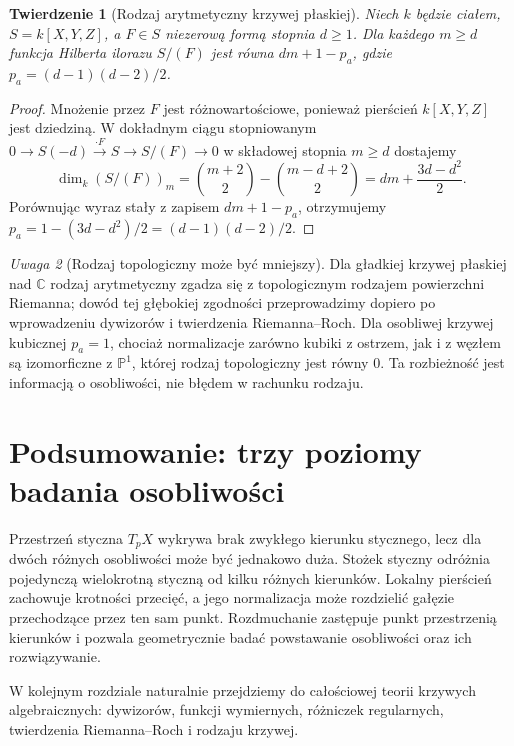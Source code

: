 \documentclass[11pt,a4paper,openany]{report}
\numberwithin{equation}{section}
\theoremstyle{plain}
\newtheorem{twierdzenie}{Twierdzenie}[section]
\theoremstyle{definition}
\theoremstyle{remark}
\newtheorem{uwaga}[twierdzenie]{Uwaga}
\newcommand{\C}{\mathbb C}
\newcommand{\PP}{\mathbb P}
\begin{document}
\begin{twierdzenie}[Rodzaj arytmetyczny krzywej płaskiej]
\label{tw:arithmetic-genus-plane}
Niech $k$ będzie ciałem, $S=k[X,Y,Z]$, a $F\in S$
niezerową formą stopnia $d\ge1$. Dla każdego $m\ge d$
funkcja Hilberta ilorazu $S/(F)$ jest równa $dm+1-p_a$,
gdzie $p_a=(d-1)(d-2)/2$.
\end{twierdzenie}
\begin{proof}
Mnożenie przez $F$ jest różnowartościowe,
ponieważ pierścień $k[X,Y,Z]$ jest dziedziną.
W dokładnym ciągu stopniowanym
$0\to S(-d)\xrightarrow{\cdot F}S\to S/(F)\to0$
w składowej stopnia $m\ge d$ dostajemy
\[
 \dim_k(S/(F))_m=\binom{m+2}{2}-\binom{m-d+2}{2}
 =dm+\frac{3d-d^2}{2}.
\]
Porównując wyraz stały z zapisem $dm+1-p_a$,
otrzymujemy $p_a=1-(3d-d^2)/2=(d-1)(d-2)/2$.
\end{proof}

\begin{uwaga}[Rodzaj topologiczny może być mniejszy]
Dla gładkiej krzywej płaskiej nad $\C$ rodzaj
arytmetyczny zgadza się z topologicznym rodzajem
powierzchni Riemanna; dowód tej głębokiej zgodności
przeprowadzimy dopiero po wprowadzeniu dywizorów
i twierdzenia Riemanna--Roch. Dla osobliwej krzywej
kubicznej $p_a=1$, chociaż normalizacje zarówno
kubiki z ostrzem, jak i z węzłem są izomorficzne
z $\PP^1$, której rodzaj topologiczny jest równy $0$.
Ta rozbieżność jest informacją o osobliwości, nie błędem
w rachunku rodzaju.
\end{uwaga}

\section{Podsumowanie: trzy poziomy badania osobliwości}

Przestrzeń styczna $T_pX$ wykrywa brak zwykłego kierunku
stycznego, lecz dla dwóch różnych osobliwości może być
jednakowo duża. Stożek styczny odróżnia pojedynczą
wielokrotną styczną od kilku różnych kierunków.
Lokalny pierścień zachowuje krotności przecięć, a jego
normalizacja może rozdzielić gałęzie przechodzące przez
ten sam punkt. Rozdmuchanie zastępuje punkt przestrzenią
kierunków i pozwala geometrycznie badać powstawanie
osobliwości oraz ich rozwiązywanie.

W kolejnym rozdziale naturalnie przejdziemy do
całościowej teorii krzywych algebraicznych:
dywizorów, funkcji wymiernych, różniczek regularnych,
twierdzenia Riemanna--Roch i rodzaju krzywej.


\end{document}
